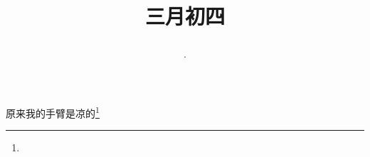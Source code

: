 \title{\date[d=12,m=4,y=2024][year:cn-y,年,month:cn,day:cn,日,·,weekday]·三月初四 }
原来我的手臂是凉的\footnote{ }

